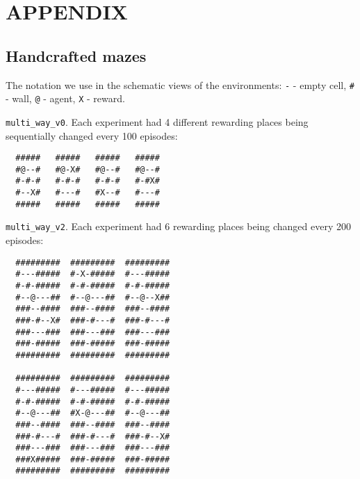 \documentclass[a4paper,twoside]{article}
\begin{document}
{\small}

\section*{\uppercase{Appendix}}

\subsection{Handcrafted mazes} \label{apx_handcrafted_mazes}

The notation we use in the schematic views of the environments: \verb|-| - empty cell, \verb|#| - wall, \verb|@| - agent, \verb|X| - reward.

\texttt{multi\_way\_v0}. Each experiment had 4 different rewarding places being sequentially changed every 100 episodes:

\begin{verbatim}
  #####   #####   #####   #####
  #@--#   #@-X#   #@--#   #@--#
  #-#-#   #-#-#   #-#-#   #-#X#
  #--X#   #---#   #X--#   #---#
  #####   #####   #####   #####
\end{verbatim}

\texttt{multi\_way\_v2}. Each experiment had 6 rewarding places being changed every 200 episodes:

\begin{verbatim}
  #########  #########  #########
  #---#####  #-X-#####  #---#####
  #-#-#####  #-#-#####  #-#-#####
  #--@---##  #--@---##  #--@--X##
  ###--####  ###--####  ###--####
  ###-#--X#  ###-#---#  ###-#---#
  ###---###  ###---###  ###---###
  ###-#####  ###-#####  ###-#####
  #########  #########  #########

  #########  #########  #########
  #---#####  #---#####  #---#####
  #-#-#####  #-#-#####  #-#-#####
  #--@---##  #X-@---##  #--@---##
  ###--####  ###--####  ###--####
  ###-#---#  ###-#---#  ###-#--X#
  ###---###  ###---###  ###---###
  ###X#####  ###-#####  ###-#####
  #########  #########  #########
\end{verbatim}
\end{document}
